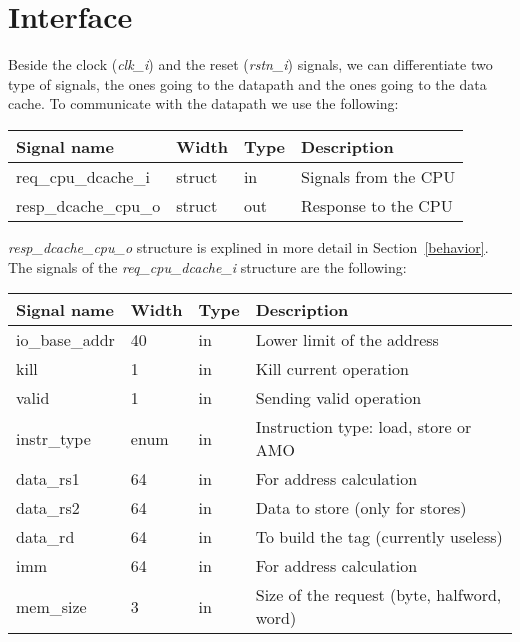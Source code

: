 \section{Interface}
\label{chapter 4}


Beside the clock (\textit{clk\_i}) and the reset (\textit{rstn\_i}) signals, we can differentiate two type of signals, the ones going to the datapath and the ones going to the data cache.
To communicate with the datapath we use the following:

\begin{table}[H]
\centering
\begin{tabular}{llll}
\textbf{Signal name} & \textbf{Width} & \textbf{Type} & \textbf{Description} \\
\hline
req\_cpu\_dcache\_i & struct & in & Signals from the CPU \\
resp\_dcache\_cpu\_o & struct & out & Response to the CPU \\
\end{tabular}
\end{table}

\textit{resp\_dcache\_cpu\_o} structure is explined in more detail in Section~\ref{behavior}.
The signals of the \textit{req\_cpu\_dcache\_i} structure are the following:

\begin{table}[H]
\centering
\begin{tabular}{llll}
\textbf{Signal name} & \textbf{Width} & \textbf{Type} & \textbf{Description} \\
\hline
io\_base\_addr & 40 & in & Lower limit of the address \\
kill & 1 & in & Kill current operation \\
valid & 1 & in & Sending valid operation \\
instr\_type & enum & in & Instruction type: load, store or AMO \\
data\_rs1 & 64 & in & For address calculation \\
data\_rs2 & 64 & in & Data to store (only for stores) \\
data\_rd & 64 & in & To build the tag (currently useless) \\
imm & 64 & in & For address calculation \\
mem\_size & 3 & in & Size of the request (byte, halfword, word) \\
\end{tabular}
\end{table}

